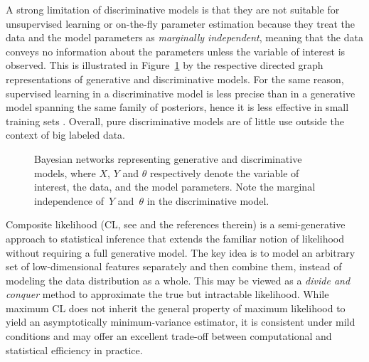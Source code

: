 \documentclass[english]{scrartcl}
\begin{document}
A strong limitation of discriminative models is that they are not suitable for unsupervised learning or on-the-fly parameter estimation because they treat the data and the model parameters as {\em marginally independent}, meaning that the data conveys no information about the parameters unless the variable of interest is observed. This is illustrated in Figure~\ref{fig:graph_comparison} by the respective directed graph representations of generative and discriminative models. For the same reason, supervised learning in a discriminative model is less precise than in a generative model spanning the same family of posteriors, hence it is less effective in small training sets \cite{Ng-01}. Overall, pure discriminative models are of little use outside the context of big labeled data.


\begin{figure}[!ht]
\begin{center}
\hspace*{.2\textwidth}
\caption{Bayesian networks representing generative and discriminative models, where $X$, $Y$ and $\theta$ respectively denote the variable of interest, the data, and the model parameters. Note the marginal independence of~$Y$ and~$\theta$ in the discriminative model.}
\label{fig:graph_comparison}
\end{center}
\end{figure}

Composite likelihood (CL, see \cite{Varin-11} and the references therein) is a semi-generative approach to statistical inference that extends the familiar notion of likelihood without requiring a full generative model. The key idea is to model an arbitrary set of low-dimensional features separately and then combine them, instead of modeling the data distribution as a whole. This may be viewed as a {\em divide and conquer} method to approximate the true but intractable likelihood. While maximum CL does not inherit the general property of maximum likelihood to yield an asymptotically minimum-variance estimator, it is consistent under mild conditions \cite{Xu-11} and may offer an excellent trade-off between computational and statistical efficiency in practice. 
\end{document}
